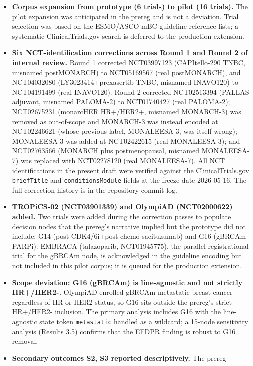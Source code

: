 \documentclass[11pt,a4paper]{article}
\begin{document}
\begin{itemize}
\item \textbf{Corpus expansion from prototype (6 trials) to pilot (16 trials).}
  The pilot expansion was anticipated in the prereg and is not a deviation.
  Trial selection was based on the ESMO/ASCO mBC guideline reference lists;
  a systematic ClinicalTrials.gov search is deferred to the production extension.
\item \textbf{Six NCT-identification corrections across Round 1 and Round 2 of
  internal review.} Round 1 corrected NCT03997123 (CAPItello-290 TNBC,
  misnamed postMONARCH) to NCT05169567 (real postMONARCH), and NCT04032080
  (LY3023414+prexasertib TNBC, misnamed INAVO120) to NCT04191499 (real
  INAVO120). Round 2 corrected NCT02513394 (PALLAS adjuvant, misnamed PALOMA-2)
  to NCT01740427 (real PALOMA-2); NCT02675231 (monarcHER HR+/HER2+, misnamed
  MONARCH-3) was removed as out-of-scope and MONARCH-3 was instead encoded
  at NCT02246621 (whose previous label, MONALEESA-3, was itself wrong);
  MONALEESA-3 was added at NCT02422615 (real MONALEESA-3); and NCT02763566
  (MONARCH plus postmenopausal, misnamed MONALEESA-7) was replaced with
  NCT02278120 (real MONALEESA-7). All NCT identifications in the present
  draft were verified against the ClinicalTrials.gov \texttt{briefTitle} and
  \texttt{conditionsModule} fields at the freeze date 2026-05-16. The full
  correction history is in the repository commit log.
\item \textbf{TROPiCS-02 (NCT03901339) and OlympiAD (NCT02000622) added.}
  Two trials were added during the correction passes to populate
  decision nodes that the prereg's narrative implied but the prototype
  did not include: G14 (post-CDK4/6i+post-chemo sacituzumab) and G16
  (gBRCAm PARPi). EMBRACA (talazoparib, NCT01945775), the parallel
  registrational trial for the gBRCAm node, is acknowledged in the
  guideline encoding but not included in this pilot corpus; it is queued
  for the production extension.
\item \textbf{Scope deviation: G16 (gBRCAm) is line-agnostic and not strictly
  HR+/HER2-.} OlympiAD enrolled gBRCAm metastatic breast cancer regardless
  of HR or HER2 status, so G16 sits outside the prereg's strict HR+/HER2-
  inclusion. The primary analysis includes G16 with the line-agnostic state
  token \texttt{metastatic} handled as a wildcard; a 15-node sensitivity
  analysis (Results 3.5) confirms that the EFDPR finding is robust to G16
  removal.
\item \textbf{Secondary outcomes S2, S3 reported descriptively.} The prereg

\end{itemize}
\end{document}
